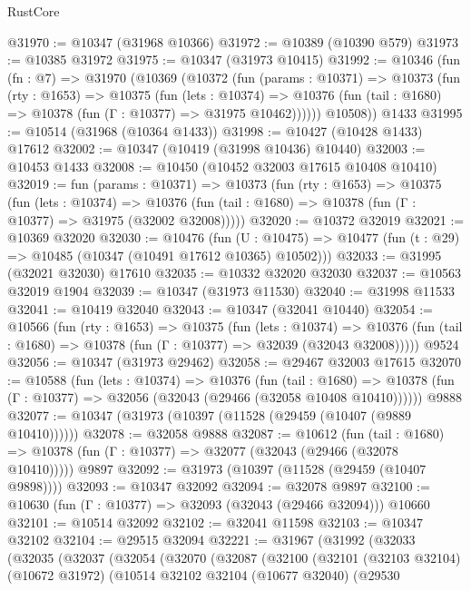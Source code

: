 \begin{lexlean}{RustCore}
\begin{coremodule}
@31970 := @10347 (@31968 @10366)
@31972 := @10389 (@10390 @579)
@31973 := @10385 @31972
@31975 := @10347 (@31973 @10415)
@31992 := @10346
    (fun (fn : @7) =>
    @31970
      (@10369
        (@10372
          (fun (params : @10371) =>
          @10373
            (fun (rty : @1653) =>
            @10375
              (fun (lets : @10374) =>
              @10376 (fun (tail : @1680) => @10378 (fun (Γ : @10377) => @31975 @10462))))))
        @10508))
    @1433
@31995 := @10514 (@31968 (@10364 @1433))
@31998 := @10427 (@10428 @1433) @17612
@32002 := @10347 (@10419 (@31998 @10436) @10440)
@32003 := @10453 @1433
@32008 := @10450 (@10452 @32003 @17615 @10408 @10410)
@32019 := fun (params : @10371) =>
  @10373
    (fun (rty : @1653) =>
    @10375
      (fun (lets : @10374) =>
      @10376 (fun (tail : @1680) => @10378 (fun (Γ : @10377) => @31975 (@32002 @32008)))))
@32020 := @10372 @32019
@32021 := @10369 @32020
@32030 := @10476
    (fun (U : @10475) => @10477 (fun (t : @29) => @10485 (@10347 (@10491 @17612 @10365) @10502)))
@32033 := @31995 (@32021 @32030) @17610
@32035 := @10332 @32020 @32030
@32037 := @10563 @32019 @1904
@32039 := @10347 (@31973 @11530)
@32040 := @31998 @11533
@32041 := @10419 @32040
@32043 := @10347 (@32041 @10440)
@32054 := @10566
    (fun (rty : @1653) =>
    @10375
      (fun (lets : @10374) =>
      @10376 (fun (tail : @1680) => @10378 (fun (Γ : @10377) => @32039 (@32043 @32008)))))
    @9524
@32056 := @10347 (@31973 @29462)
@32058 := @29467 @32003 @17615
@32070 := @10588
    (fun (lets : @10374) =>
    @10376
      (fun (tail : @1680) =>
      @10378 (fun (Γ : @10377) => @32056 (@32043 (@29466 (@32058 @10408 @10410))))))
    @9888
@32077 := @10347 (@31973 (@10397 (@11528 (@29459 (@10407 (@9889 @10410))))))
@32078 := @32058 @9888
@32087 := @10612
    (fun (tail : @1680) => @10378 (fun (Γ : @10377) => @32077 (@32043 (@29466 (@32078 @10410)))))
    @9897
@32092 := @31973 (@10397 (@11528 (@29459 (@10407 @9898))))
@32093 := @10347 @32092
@32094 := @32078 @9897
@32100 := @10630 (fun (Γ : @10377) => @32093 (@32043 (@29466 @32094))) @10660
@32101 := @10514 @32092
@32102 := @32041 @11598
@32103 := @10347 @32102
@32104 := @29515 @32094
@32221 := @31967
    (@31992
      (@32033
        (@32035
          (@32037
            (@32054
              (@32070
                (@32087
                  (@32100
                    (@32101
                      (@32103 @32104)
                      (@10672 @31972)
                      (@10514
                        @32102
                        @32104
                        (@10677 @32040)
                        (@29530

\end{coremodule}
\end{lexlean}
